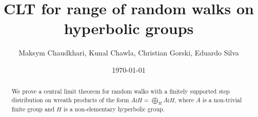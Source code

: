 \documentclass[reqno,oneside,11pt]{amsart}
\title{CLT for range of random walks on hyperbolic groups}
\author{Maksym Chaudkhari, Kunal Chawla, Christian Gorski, Eduardo Silva }
\date{\today}
\begin{document}
	\begin{abstract} 
We prove a central limit theorem for random walks with a finitely supported step distribution on wreath products of the form $A\wr H=\bigoplus_H A\wr H $, where $A$ is a non-trivial finite group and $H$ is a non-elementary hyperbolic group.
	\end{abstract}
\maketitle






%

%
%



\end{document}
